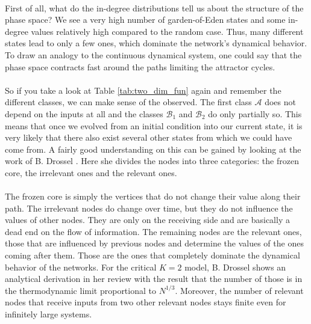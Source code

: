 \paragraph*{}
First of all, what do the in-degree distributions tell us about the structure of the phase space? We see a very high number of garden-of-Eden states and some in-degree values relatively high compared to the random case. Thus, many different states lead to only a few ones, which dominate the network's dynamical behavior. To draw an analogy to the continuous dynamical system, one could say that the phase space contracts fast around the paths limiting the attractor cycles.

\paragraph*{}
So if you take a look at Table \ref{tab:two_dim_fun} again and remember the different classes, we can make sense of the observed. The first class $\mathcal{A}$ does not depend on the inputs at all and the classes $\mathcal{B}_1$ and $\mathcal{B}_2$ do only partially so. This means that once we evolved from an initial condition into our current state, it is very likely that there also exist several other states from which we could have come from. A fairly good understanding on this can be gained by looking at the work of B. Drossel \cite{drossel2008random}. Here she divides the nodes into three categories: the frozen core, the irrelevant ones and the relevant ones. 

\paragraph*{}
The frozen core is simply the vertices that do not change their value along their path. The irrelevant nodes do change over time, but they do not influence the values of other nodes. They are only on the receiving side and are basically a dead end on the flow of information. The remaining nodes are the relevant ones, those that are influenced by previous nodes and determine the values of the ones coming after them. Those are the ones that completely dominate the dynamical behavior of the networks. For the critical $K=2$ model, B. Drossel \cite{drossel2008random} shows an analytical derivation in her review with the result that the number of those is in the thermodynamic limit proportional to $N^{1/3}$. Moreover, the number of relevant nodes that receive inputs from two other relevant nodes stays finite even for infinitely large systems.


